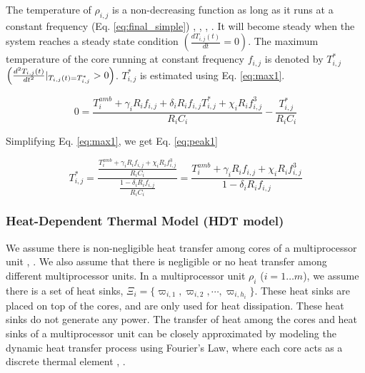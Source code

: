 \documentclass[conference]{IEEEtran}
\begin{document}
The temperature of $\rho_{i,j}$  is a non-decreasing function as long as it runs at a constant frequency (Eq. \ref{eq:final_simple})
\cite{Chantem10}, \cite{Quan10}, \cite{Fisher09},  \cite{Chaturvedi10}.
It will become steady when the system reaches a steady state condition $\left(\frac{dT_{i,j}(t)}{dt}=0\right)$.  The maximum temperature of the
core running at constant frequency $f_{i,j}$ is denoted by $T^*_{i,j}$ $ \left(\frac{d^2T_{i,j}(t)}{dt^2} \arrowvert_{T_{i,j}(t)=T^*_{i,j}} >0\right)$.
$T^*_{i,j}$ is estimated using Eq. \ref{eq:max1}.

\vspace{-0.1in}

\begin{equation}\label{eq:max1}
			0 =  \frac{ T_i^{amb} + \gamma_i  R_i f_{i,j} + \delta_i  R_i f_{i,j} T^*_{i,j} + \chi_i  R_i f_{i,j}^3 } { R_iC_i} - \frac{T^*_{i,j}}{R_iC_i}
\end{equation}

\vspace{-0.1in}

Simplifying Eq. \ref{eq:max1}, we get Eq. \ref{eq:peak1}

\vspace{-0.1in}

\begin{equation}\label{eq:peak1}
T^*_{i,j} = \frac{ \frac{T_i^{amb} + \gamma_i R_i f_{i,j} + \chi_i R_i f_{i,j}^3}{R_iC_i} }{ \frac{1 - \delta_iR_i f_{i,j}}{R_iC_i} } =
\frac{T_i^{amb} + \gamma_i R_if_{i,j} + \chi_i R_if_{i,j}^3}{1-\delta_i R_if_{i,j}}
\end{equation}
\vspace{-0.2in}


\subsubsection{Heat-Dependent Thermal Model (HDT model)}
\label{sec:complex}

We assume there is non-negligible heat transfer among cores of a multiprocessor unit \cite{Chantem10}, \cite{Fisher09}.
We also assume that there is negligible or no heat transfer among different multiprocessor units.
In a multiprocessor unit $\rho_i$ ($i=1\ldots m$), we assume there is a set of heat sinks, $\Xi_i = \{\varpi_{i,1}, \varpi_{i,2},\cdots, \varpi_{i,h_i}\}$.
These heat sinks are placed on top of the cores, and are only used for heat dissipation. These heat sinks do not generate any power.
The transfer of heat among the cores and heat sinks of a multiprocessor unit can be closely approximated by modeling
the dynamic heat transfer process
using Fourier's Law, where
each core acts as a discrete thermal element  \cite{Chantem10}, \cite{Fisher09}.
\end{document}
